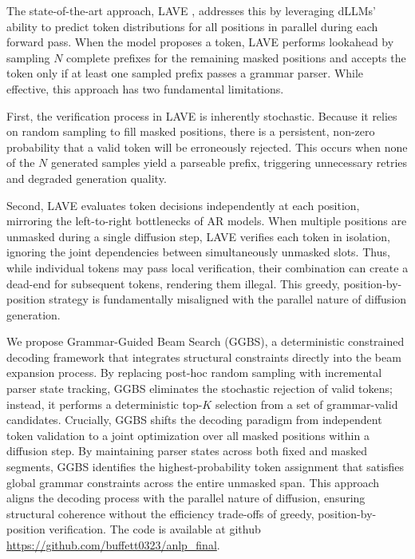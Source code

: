 


The state-of-the-art approach, LAVE \citep{zhang2026lookaheadthenverifyreliableconstraineddecoding}, addresses this by leveraging dLLMs' ability to predict token distributions for all positions in parallel during each forward pass. When the model proposes a token, LAVE performs lookahead by sampling $N$ complete prefixes for the remaining masked positions and accepts the token only if at least one sampled prefix passes a grammar parser. While effective, this approach has two fundamental limitations.

First, the verification process in LAVE is inherently stochastic. Because it relies on random sampling to fill masked positions, there is a persistent, non-zero probability that a valid token will be erroneously rejected. This occurs when none of the $N$ generated samples yield a parseable prefix, triggering unnecessary retries and degraded generation quality.

Second, LAVE evaluates token decisions independently at each position, mirroring the left-to-right bottlenecks of AR models. When multiple positions are unmasked during a single diffusion step, LAVE verifies each token in isolation, ignoring the joint dependencies between simultaneously unmasked slots. Thus, while individual tokens may pass local verification, their combination can create a dead-end for subsequent tokens, rendering them illegal. This greedy, position-by-position strategy is fundamentally misaligned with the parallel nature of diffusion generation.

We propose Grammar-Guided Beam Search (GGBS), a deterministic constrained decoding framework that integrates structural constraints directly into the beam expansion process. By replacing post-hoc random sampling with incremental parser state tracking, GGBS eliminates the stochastic rejection of valid tokens; instead, it performs a deterministic top-$K$ selection from a set of grammar-valid candidates. Crucially, GGBS shifts the decoding paradigm from independent token validation to a joint optimization over all masked positions within a diffusion step. By maintaining parser states across both fixed and masked segments, GGBS identifies the highest-probability token assignment that satisfies global grammar constraints across the entire unmasked span. This approach aligns the decoding process with the parallel nature of diffusion, ensuring structural coherence without the efficiency trade-offs of greedy, position-by-position verification. The code is available at github \url{https://github.com/buffett0323/anlp_final}.


